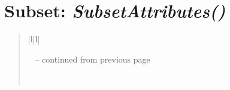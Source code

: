 \documentclass[letterpaper,10pt,english]{sphinxmanual}
\begin{document}
\section{\textbf{Subset}: \emph{SubsetAttributes()}}
\label{attributes:subset-subsetattributes}
\begin{DUlineblock}{0em}
\item[] 
\end{DUlineblock}
\begin{quote}

\begin{longtable}{|l|l|}
\hline
\endfirsthead

%
{{\textsf{\tablename\ \thetable{} -- continued from previous page}}} \\
\hline
\endhead

\hline {} \\ \hline
\endfoot

\endlastfoot



\end{longtable}
\end{quote}
\end{document}
